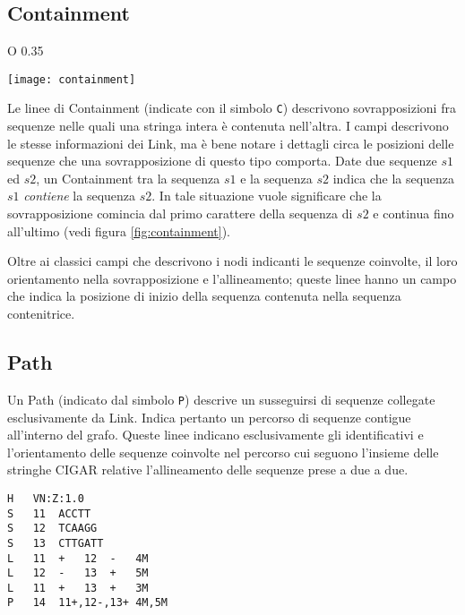 \subsection{Containment}
\label{sec:containment}
\begin{wrapfigure} {O} {0.35\textwidth}
	\begin{centering}	
		\texttt{[image: containment]}
		\caption[Rappresentazione di una situazione di contenimento fra sequenze]
		{Una rappresentazione grafica della situazione di contenimento fra due sequenze.}
		\label{fig:containment}
	\end{centering}
\end{wrapfigure}
Le linee di Containment (indicate con il simbolo \texttt{C})
descrivono sovrapposizioni fra sequenze nelle quali una stringa intera
è contenuta nell'altra.
I campi descrivono le stesse informazioni dei Link, ma è bene notare
i dettagli circa le posizioni delle sequenze che una sovrapposizione di
questo tipo comporta.
Date due sequenze $s1$ ed $s2$, un Containment tra la sequenza $s1$ e la
sequenza $s2$ indica che la sequenza $s1$ \emph{contiene} la sequenza
$s2$. In tale situazione vuole significare che la sovrapposizione comincia
dal primo carattere della sequenza di $s2$ e continua fino all'ultimo
(vedi figura \ref{fig:containment}).

Oltre ai classici campi che descrivono i nodi indicanti le sequenze coinvolte,
il loro orientamento nella sovrapposizione e l'allineamento; queste linee hanno un campo
che indica la posizione di inizio della sequenza contenuta nella sequenza
contenitrice.

\subsection{Path}
Un Path (indicato dal simbolo \texttt{P}) descrive un susseguirsi di
sequenze collegate esclusivamente da Link. Indica pertanto un percorso
di sequenze contigue all'interno del grafo. Queste linee
indicano esclusivamente gli identificativi e l'orientamento delle sequenze
coinvolte nel percorso cui seguono l'insieme delle stringhe CIGAR relative
l'allineamento delle sequenze prese a due a due.

\newpage
\captionsetup{justification=centering, singlelinecheck=false}
\begin{lstlisting}[basicstyle=\ttfamily, frame=topline, caption=Un esempio di file GFA 1.]
H	VN:Z:1.0
S	11	ACCTT
S	12	TCAAGG
S	13	CTTGATT
L	11	+	12	-	4M
L	12	-	13	+	5M
L	11	+	13	+	3M
P	14	11+,12-,13+	4M,5M
\end{lstlisting}
\captionsetup{justification=justified, singlelinecheck=false}


